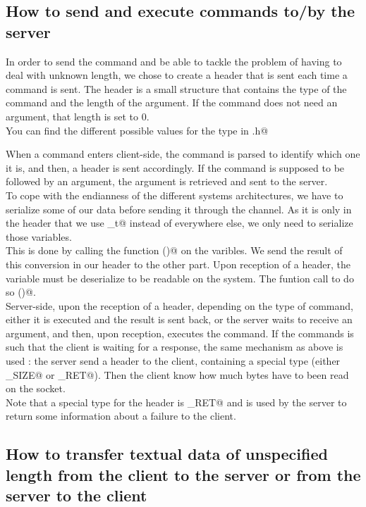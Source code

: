 \documentclass{article}
\begin{document}
\subsection{How to send and execute commands to/by the server}
In order to send the command and be able to tackle the problem of having to deal with unknown length, we chose to create a header that is sent each time a command is sent.
The header is a small structure that contains the type of the command and the length of the argument. If the command does not need an argument, that length is set to $0$.\\

You can find the different possible values for the type in \verb@header.h@ 

When a command enters client-side, the command is parsed to identify which one it is, and then, a header is sent accordingly. If the command is supposed to be followed by an argument, the argument is retrieved and sent to the server.\\

To cope with the endianness of the different systems architectures, we have to serialize some of our data before sending it through the channel. As it is only in the header that we use _t@ instead of \verb@char@ everywhere else, we only need to serialize those variables.\\
This is done by calling the function \verb@htonl()@ on the varibles. We send the result of this conversion in our header to the other part. Upon reception of a header, the variable must be deserialize to be readable on the system. The funtion call to do so \verb@ntohl()@.\\

Server-side, upon the reception of a header, depending on the type of command, either it is executed and the result is sent back, or the server waits to receive an argument, and then, upon reception, executes the command. If the commands is such that the client is waiting for a response, the same mechanism as above is used : the server send a header to the client, containing a special type (either \verb@GET_SIZE@ or \verb@ERRNO_RET@). Then the client know how much bytes have to been read on the socket.\\

Note that a special type for the header is \verb@ERRNO_RET@ and is used by the server to return some information about a failure to the client.

\subsection{How to transfer textual data of unspecified length from the client to the server or from the server to the client}
\end{document}
